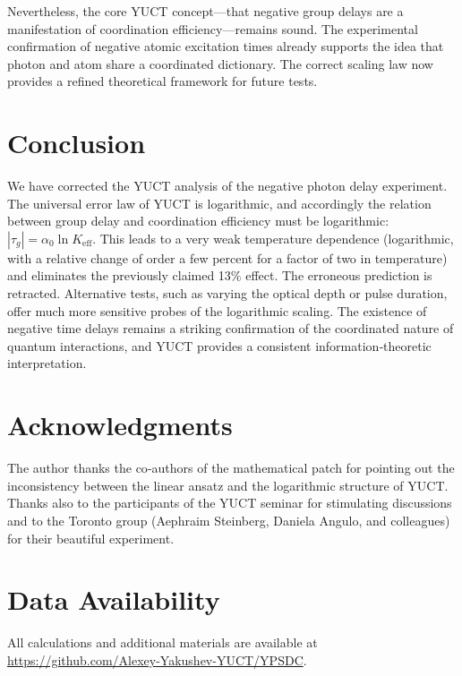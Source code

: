 \documentclass[12pt,a4paper]{article}
\newcommand{\Keff}{K_{\mathrm{eff}}}
\begin{document}
	Nevertheless, the core YUCT concept—that negative group delays are a manifestation of coordination efficiency—remains sound. The experimental confirmation of negative atomic excitation times already supports the idea that photon and atom share a coordinated dictionary. The correct scaling law now provides a refined theoretical framework for future tests.
	
	\section{Conclusion}
	
	We have corrected the YUCT analysis of the negative photon delay experiment. The universal error law of YUCT is logarithmic, and accordingly the relation between group delay and coordination efficiency must be logarithmic: \(|\tau_g| = \alpha_0 \ln\Keff\). This leads to a very weak temperature dependence (logarithmic, with a relative change of order a few percent for a factor of two in temperature) and eliminates the previously claimed 13\% effect. The erroneous prediction is retracted. Alternative tests, such as varying the optical depth or pulse duration, offer much more sensitive probes of the logarithmic scaling. The existence of negative time delays remains a striking confirmation of the coordinated nature of quantum interactions, and YUCT provides a consistent information‑theoretic interpretation.
	
	\section*{Acknowledgments}
	
	The author thanks the co‑authors of the mathematical patch for pointing out the inconsistency between the linear ansatz and the logarithmic structure of YUCT. Thanks also to the participants of the YUCT seminar for stimulating discussions and to the Toronto group (Aephraim Steinberg, Daniela Angulo, and colleagues) for their beautiful experiment.
	
	\section*{Data Availability}
	
	All calculations and additional materials are available at \url{https://github.com/Alexey-Yakushev-YUCT/YPSDC}.
	
\end{document}
